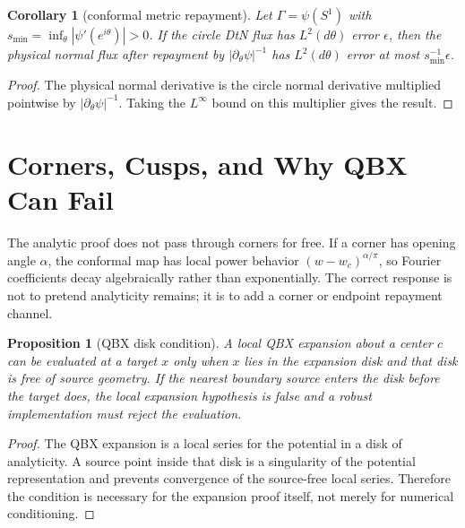 \documentclass[10pt,leqno]{article}
\numberwithin{equation}{section}
\theoremstyle{plain}
\newtheorem{proposition}[theorem]{Proposition}
\newtheorem{corollary}[theorem]{Corollary}
\theoremstyle{definition}
\theoremstyle{remark}
\begin{document}
\begin{corollary}[conformal metric repayment]\label{cor:metric-repay}
Let $\Gamma=\psi(S^1)$ with $s_{\min}=\inf_\theta|\psi'(e^{i\theta})|>0$.  If the circle DtN flux has $L^2(d\theta)$ error $\epsilon$, then the physical normal flux after repayment by $|\partial_\theta\psi|^{-1}$ has $L^2(d\theta)$ error at most $s_{\min}^{-1}\epsilon$.
\end{corollary}
\begin{proof}
The physical normal derivative is the circle normal derivative multiplied pointwise by $|\partial_\theta\psi|^{-1}$.  Taking the $L^\infty$ bound on this multiplier gives the result.
\end{proof}
\par\noindent{}\par
\section{Corners, Cusps, and Why QBX Can Fail}
The analytic proof does not pass through corners for free.  If a corner has opening angle $\alpha$, the conformal map has local power behavior $(w-w_c)^{\alpha/\pi}$, so Fourier coefficients decay algebraically rather than exponentially.  The correct response is not to pretend analyticity remains; it is to add a corner or endpoint repayment channel.

\begin{proposition}[QBX disk condition]\label{prop:qbx-disk}
A local QBX expansion about a center $c$ can be evaluated at a target $x$ only when $x$ lies in the expansion disk and that disk is free of source geometry.  If the nearest boundary source enters the disk before the target does, the local expansion hypothesis is false and a robust implementation must reject the evaluation.
\end{proposition}
\begin{proof}
The QBX expansion is a local series for the potential in a disk of analyticity.  A source point inside that disk is a singularity of the potential representation and prevents convergence of the source-free local series.  Therefore the condition is necessary for the expansion proof itself, not merely for numerical conditioning.
\end{proof}
\end{document}
